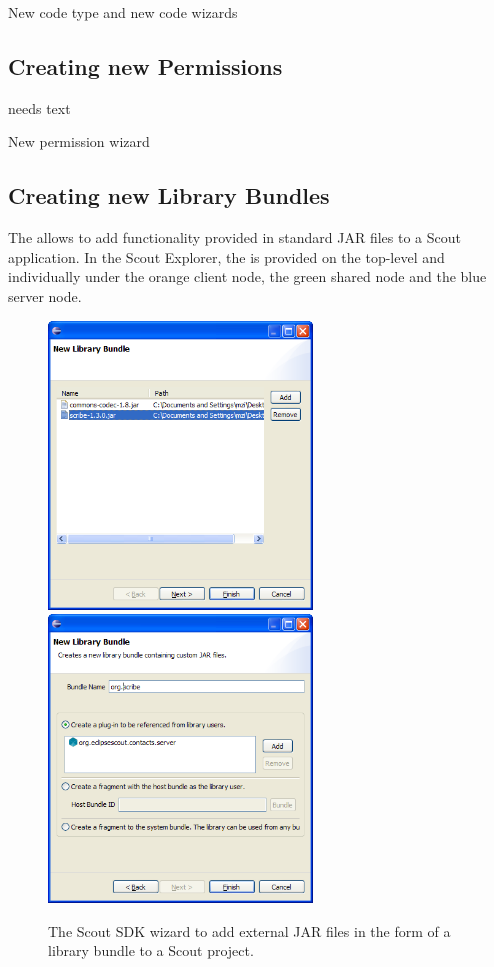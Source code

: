 \documentclass[a4paper,10pt,twoside]{book}
\begin{document}
New code type and new code wizards

\subsection{Creating new Permissions}
needs text

New permission wizard


\subsection{Creating new Library Bundles}

The  allows to add functionality provided in standard JAR files to a Scout application. 
In the Scout Explorer, the  is provided on the top-level  and individually under the orange client node, the green shared node and the blue server node. 

\begin{figure}
\includegraphics[width=7cm]{wizard_library_bundle_1.png} \hspace{5mm}
\includegraphics[width=7cm]{wizard_library_bundle_2.png}
\caption{The Scout SDK wizard to add external JAR files in the form of a library bundle to a Scout project.}
\end{figure}
\end{document}
